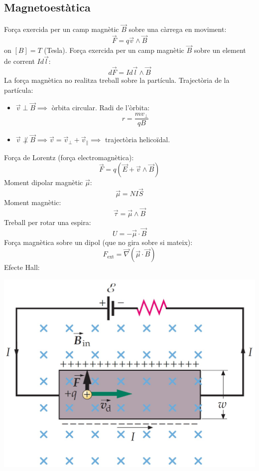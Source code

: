 \documentclass[../../../main.tex]{subfiles}
\begin{document}
\begin{multicols}{2}
\subsection{Magnetoestàtica}
Força exercida per un camp magnètic $\Vec{B}$ sobre una càrrega en moviment: $$\Vec{F}=q\Vec{v}\wedge\Vec{B}$$ {on $[B]=T$ (Tesla).}\newline
Força exercida per un camp magnètic $\Vec{B}$ sobre un element de corrent $Id\Vec{l}$: $$d\Vec{F}=Id\Vec{l}\wedge\Vec{B}$$
La força magnètica no realitza treball sobre la partícula.\newline
Trajectòria de la partícula:
\begin{itemize}
    \item $\Vec{v}\perp\Vec{B}\implies$ òrbita circular. Radi de l'òrbita:$$r=\frac{mv_\perp}{qB}$$
    \item $\Vec{v}\not\perp\Vec{B}\implies\Vec{v}=\Vec{v}_\perp+\Vec{v}_\parallel\implies$ trajectòria helicoïdal.
\end{itemize}
Força de Lorentz (força electromagnètica): $$\Vec{F}=q(\Vec{E}+\Vec{v}\wedge\Vec{B})$$
Moment dipolar magnètic $\Vec{\mu}$: $$\Vec{\mu}=NI\Vec{S}$$
Moment magnètic: $$\Vec{\tau}=\Vec{\mu}\wedge\Vec{B}$$ 
Treball per rotar una espira: $$U=-\Vec{\mu}\cdot\Vec{B}$$
Força magnètica sobre un dipol (que no gira sobre si mateix): $$F_{\text{ext}}=\Vec{\nabla}(\Vec{\mu}\cdot\Vec{B})$$
Efecte Hall:\newline
\begin{minipage}{\linewidth}
    \centering
    \includegraphics[width=\linewidth]{Physics/1st/Electricity_and_magnetism/Images/hall+.jpg}

\end{minipage}
\end{multicols}
\end{document}
